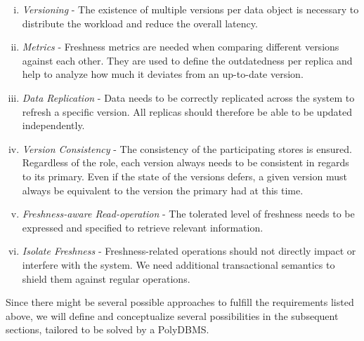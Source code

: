 \begin{enumerate}[(i)]
    \item \textit{Versioning} -                     The existence of multiple versions per data object is necessary to distribute the workload 
                                                    and reduce the overall latency.

    \item \textit{Metrics} -                        Freshness metrics are needed when comparing different versions against each other.
                                                    They are used to define the outdatedness per replica and help to analyze how much it deviates from an up-to-date version.

    \item \textit{Data Replication} -               Data needs to be correctly replicated across the system to refresh a specific version.
                                                    All replicas should therefore be able to be updated independently.

    \item \textit{Version Consistency} -            The consistency of the participating stores is ensured. Regardless of the role, each version always needs 
                                                    to be consistent in regards to its primary. Even if the state of the versions defers, 
                                                    a given version must always be equivalent to the version the primary had at this time.
                                            
    \item \textit{Freshness-aware Read-operation} - The tolerated level of freshness needs to be expressed and specified to retrieve relevant information.
    
    \item \textit{Isolate Freshness} -              Freshness-related operations should not directly impact or interfere with the system. 
                                                    We need additional transactional semantics to shield them against regular operations.                                    

\end{enumerate}

Since there might be several possible approaches to fulfill the requirements listed above, 
we will define and conceptualize several possibilities in the subsequent sections, tailored to be solved by a PolyDBMS. 


